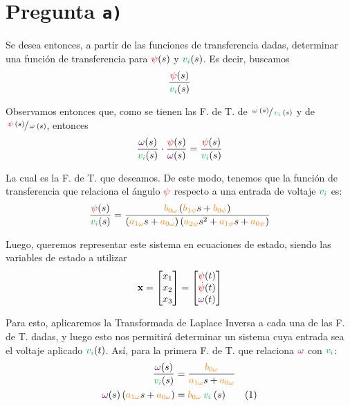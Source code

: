 \section{Pregunta \texttt{a)}}\label{pregunta-a}

Se desea entonces, a partir de las funciones de transferencia dadas, determinar
una función de transferencia para $\mathbin{\color{red}\psi} (s)$ y $\verd{v_{i}} (s)$. Es decir, buscamos
\begin{equation}
  \frac{\rojo{\psi} (s)}{\verd{v_{i}} (s)}
  \label{eq:fdt-1}
\end{equation}

Observamos entonces que, como se tienen las F. de T. de $\sfrac{\mora{\omega}(s)}{\verd{v_{i}} (s)}$
y de $\sfrac{\mathbin{\color{red}\psi}(s)}{\mathbin{\color{violet}\omega}(s)}$, entonces
\begin{equation}
  \frac{\mora{\omega} (s)}{\verd{v_{i}} (s)} \cdot \frac{\rojo{\psi} (s)}{\mora{\omega} (s)} = \frac{\rojo{\psi} (s)}{\verd{v_{i}} (s)}
\end{equation}

La cual es la F. de T. que deseamos. De este modo, tenemos que la función de
transferencia que relaciona el ángulo $\mathbin{\color{red}\psi}$ respecto a una entrada de voltaje
$\verd{v_{i}}$ es:
\begin{equation}
  \frac{\rojo{\psi} (s)}{\verd{v_{i}} (s)} =
    \frac{\nara{\nara{b_{0\omega}}}\left(\nara{b_{1\psi}}s + \nara{b_{0\psi}}\right)}
    {\left(\nara{a_{1\omega}}s + \nara{a_{0\omega}}\right)\left(\nara{a_{2\psi}}s^{2} + \nara{a_{1\psi}}s + \nara{a_{0\psi}}\right)}
  \label{eq:fdt-2}
\end{equation}

Luego, queremos representar este sistema en ecuaciones de estado, siendo las
variables de estado a utilizar
\begin{equation}
  \mathbf{x} = \begin{bmatrix}x_{1} \\ x_{2} \\ x_{3}\end{bmatrix}
    = \begin{bmatrix}\mathbin{\color{red}\psi} (t) \\ \mathbin{\color{red}\dot\psi} (t) \\ \mathbin{\color{violet}\omega} (t) \end{bmatrix}
  \label{eq:var-estado}
\end{equation}

Para esto, aplicaremos la Transformada de Laplace Inversa a cada una de las
F. de T. dadas, y luego esto nos permitirá determinar un sistema cuya entrada
sea el voltaje aplicado $\verd{v_{i}} (t)$. Así, para la primera F. de T. que relaciona
$\mathbin{\color{violet}\omega}$ con $\verd{v_{i}}$:
\begin{align}
  \frac{\mora{\omega} (s)}{\verd{v_{i}} (s)} &= \frac{\nara{b_{0\omega}}}{\nara{a_{1\omega}}s + \nara{a_{0\omega}}} \\
  \mora{\omega} (s) \left(\nara{a_{1\omega}}s + \nara{a_{0\omega}}\right) &= \nara{b_{0\omega}}\verd{v_{i}} (s)
    \stepcounter{equation}\tag{\theequation}\label{eq:fdt-3}
\end{align}

